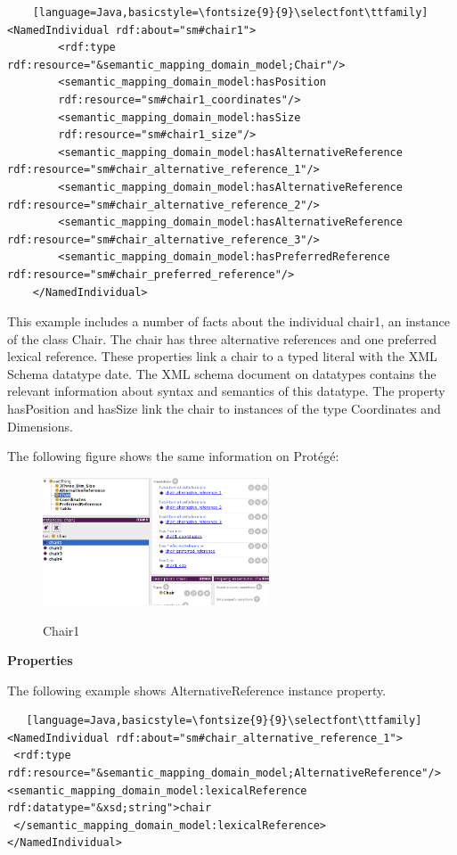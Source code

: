 \begin{lstlisting}    [language=Java,basicstyle=\fontsize{9}{9}\selectfont\ttfamily]
<NamedIndividual rdf:about="sm#chair1">
        <rdf:type rdf:resource="&semantic_mapping_domain_model;Chair"/>
        <semantic_mapping_domain_model:hasPosition 
        rdf:resource="sm#chair1_coordinates"/>
        <semantic_mapping_domain_model:hasSize 
        rdf:resource="sm#chair1_size"/>
        <semantic_mapping_domain_model:hasAlternativeReference rdf:resource="sm#chair_alternative_reference_1"/>
        <semantic_mapping_domain_model:hasAlternativeReference   rdf:resource="sm#chair_alternative_reference_2"/>
        <semantic_mapping_domain_model:hasAlternativeReference  rdf:resource="sm#chair_alternative_reference_3"/>
        <semantic_mapping_domain_model:hasPreferredReference rdf:resource="sm#chair_preferred_reference"/>
    </NamedIndividual>
\end{lstlisting}

This example includes a number of facts about the individual chair1, an instance of the class Chair. The chair has three alternative references and one preferred lexical reference. These properties link a chair to a typed literal with the XML Schema datatype date. The XML schema document on datatypes contains the relevant information about syntax and semantics of this datatype. The property hasPosition and hasSize link the chair to instances of the type Coordinates and Dimensions.

The following figure shows the same information on Prot\'eg\'e:

\begin{figure}[H]
\centering
\includegraphics[width=0.6\textwidth]{imgs/chair1.png}
\label{fig:datatypes}
\caption{Chair1}
\end{figure}

\textbf{Properties}

The following example shows AlternativeReference instance property.
\begin{lstlisting}   [language=Java,basicstyle=\fontsize{9}{9}\selectfont\ttfamily] 
<NamedIndividual rdf:about="sm#chair_alternative_reference_1">
 <rdf:type rdf:resource="&semantic_mapping_domain_model;AlternativeReference"/>  <semantic_mapping_domain_model:lexicalReference rdf:datatype="&xsd;string">chair
 </semantic_mapping_domain_model:lexicalReference>
</NamedIndividual>
\end{lstlisting}


